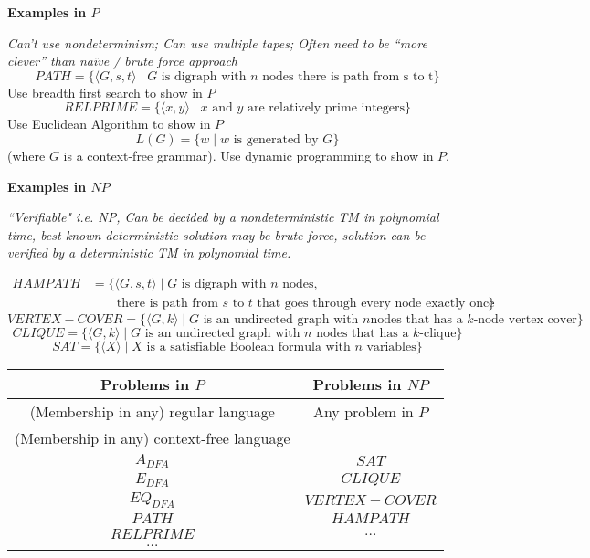 \documentclass[12pt, oneside]{article}
\begin{document}
\newpage

{\bf Examples in $P$ }

{\it Can't use nondeterminism; Can use multiple tapes; Often need to be “more clever” than naïve / brute force approach}
\[
    PATH = \{\langle G,s,t\rangle \mid \textrm{$G$ is digraph with $n$ nodes there is path from s to t}\}
\]
Use breadth first search to show in $P$
\[
    RELPRIME = \{ \langle x,y\rangle \mid \textrm{$x$ and $y$ are relatively prime integers}\}
\]
Use Euclidean Algorithm to show in $P$
\[
    L(G) = \{w \mid \textrm{$w$ is generated by $G$}\} 
\]
(where $G$ is a context-free grammar). Use dynamic programming to show in $P$.

\vfill
{\bf Examples in $NP$}

{\it ``Verifiable" i.e. NP, Can be decided by a nondeterministic TM in polynomial time,
best known deterministic solution may be brute-force, 
solution can be verified by a deterministic TM in polynomial time.}

\begin{align*}
    HAMPATH &= \{\langle G,s,t \rangle \mid \textrm{$G$ is digraph with $n$ nodes, }\\
    & \qquad \textrm{there is path
from $s$ to $t$ that goes through every node exactly once}\}
\end{align*}
\[
    VERTEX-COVER = \{ \langle G,k\rangle \mid \textrm{$G$ is an undirected graph with $n$
nodes that has a $k$-node vertex cover}\}
\]
\[
    CLIQUE = \{ \langle G,k\rangle \mid \textrm{$G$ is an undirected graph with $n$ nodes that has a $k$-clique}\}
\]
\[
    SAT =\{ \langle X \rangle \mid \textrm{$X$ is a satisfiable Boolean formula with $n$ variables}\}
\]

\begin{center}
\begin{tabular}{c|c}
    {\bf Problems in $P$} & {\bf Problems in $NP$}\\
    \hline
    (Membership in any) regular language & Any problem in $P$ \\
    (Membership in any) context-free language &  \\
    $A_{DFA}$ & $SAT$\\
    $E_{DFA}$ & $CLIQUE$ \\
    $EQ_{DFA}$ & $VERTEX-COVER$ \\
    $PATH$ & $HAMPATH$ \\
    $RELPRIME$ &  $\ldots$ \\
$\ldots$ &\\
\end{tabular}
\end{center}
\end{document}
